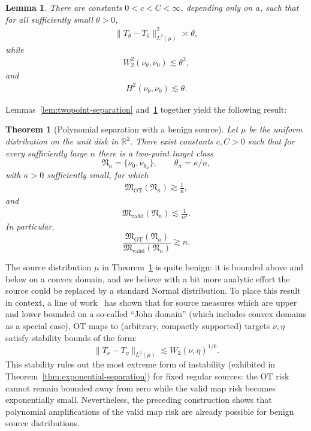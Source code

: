 \documentclass[11pt,twoside]{article}
\newtheorem{theorem}{Theorem}
\newtheorem{lemma}{Lemma}
\newcommand{\targetclass}{\mathfrak{N}}
\newcommand{\validminimaxrisk}{\mathfrak{M}_{\text{valid}}}
\newcommand{\otminimaxrisk}{\mathfrak{M}_{\text{OT}}}
\begin{document}
\begin{lemma}
\label{lem:rotating-geometry}
There are constants $0<c<C<\infty$, depending only on $a$, such that for all sufficiently small $\theta>0$,
\begin{align}
\label{eq:rotating-map-gap}
\|T_\theta-T_0\|_{L^2(\mu)}^2 \asymp \theta,
\end{align}
while
\begin{align}
\label{eq:rotating-w2-gap}
W_2^2(\nu_\theta,\nu_0)
\lesssim
\theta^2,
\end{align}
and
\begin{align}
\label{eq:rotating-hellinger}
H^2(\nu_\theta,\nu_0)
\lesssim
\theta.
\end{align}
\end{lemma}

\noindent Lemmas~\ref{lem:twopoint-separation} and~\ref{lem:rotating-geometry} together yield the following result:
\begin{theorem}[Polynomial separation with a benign source]
\label{thm:john-polynomial-separation}
Let $\mu$ be the uniform distribution on the unit disk in $\mathbb R^2$. There exist constants $c,C>0$ such that for every sufficiently large $n$ there is a two-point target class
\[
\targetclass_n=\{\nu_0,\nu_{\theta_n}\},
\qquad
\theta_n=\kappa/n,
\]
with $\kappa>0$ sufficiently small, for which
\begin{align}
\label{eq:john-ot-lower}
\otminimaxrisk(\targetclass_n)
\gtrsim
\frac{1}{n},
\end{align}
and
\begin{align}
\label{eq:john-valid-upper}
\validminimaxrisk(\targetclass_n)
\lesssim
\frac{1}{n^2}.
\end{align}
In particular,
\[
\frac{\otminimaxrisk(\targetclass_n)}
{\validminimaxrisk(\targetclass_n)}
\gtrsim n .
\]
\end{theorem}


\noindent The source distribution $\mu$ in Theorem~\ref{thm:john-polynomial-separation} is quite benign: it is bounded above and below on a convex domain, and we believe with a bit more 
analytic effort the source could be replaced by a standard Normal distribution.
To place this result in context, a line of work~\cite{letrouit2024gluing,merigot2020,delalande2023,letrouit2025lectures} has shown that for source measures which are upper and lower bounded on a so-called ``John domain'' (which includes convex domains as a special case), OT maps to (arbitrary, compactly supported) targets $\nu, \eta$ satisfy stability bounds of the form:
\[
\|T_\nu-T_\eta\|_{L^2(\mu)}
\lesssim W_2(\nu,\eta)^{1/6}.
\]
This stability rules out the most extreme form of instability (exhibited in Theorem~\ref{thm:exponential-separation}) for fixed regular sources: the OT risk cannot remain bounded away from zero while the valid map risk becomes exponentially small. Nevertheless, the preceding construction shows that polynomial amplifications of the valid map risk are already possible for benign source distributions.
\end{document}
